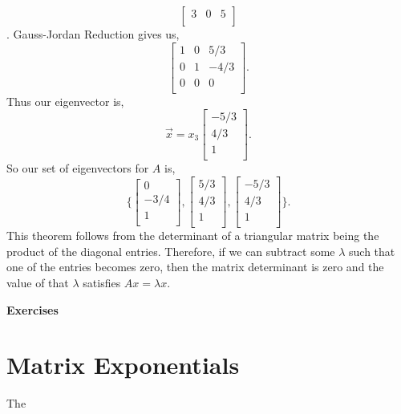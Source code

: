 {{\[\begin{bmatrix}
3 & 0 & 5 \\ \end{bmatrix} \].
Gauss-Jordan Reduction gives us, 
\[\begin{bmatrix} 1 & 0 & 5/3 \\ 0 & 1 & -4/3 \\ 0 & 0 & 0 \\ \end{bmatrix}. \]
Thus our eigenvector is, 
\[\vec{x} = x_3 \begin{bmatrix} -5/3 \\ 4/3 \\ 1 \\ \end{bmatrix}.\]
So our set of eigenvectors for $A$ is, 
\[\biggl\{\begin{bmatrix} 0 \\ -3/4 \\ 1 \\ \end{bmatrix}, \begin{bmatrix} 5/3 \\ 4/3 \\ 1 \\ \end{bmatrix}, \begin{bmatrix} -5/3 \\ 4/3 \\ 1 \\ \end{bmatrix}\biggr \}. \]
}
This theorem follows from the determinant of a triangular matrix being the product of the diagonal entries. Therefore, if we can subtract some $\lambda$ such that one of the entries becomes zero, then the matrix determinant is zero and the value of that $\lambda$ satisfies $Ax = \lambda x$.

\begin{flushleft}
\LARGE \textbf{Exercises} \\
\normalsize
\end{flushleft}

\section{Matrix Exponentials}
The





}
